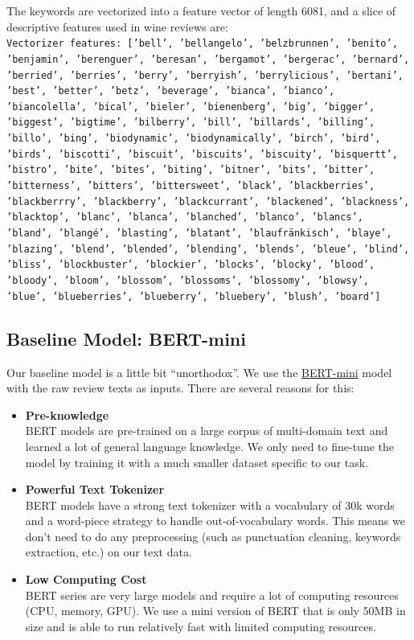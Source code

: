 \documentclass[
]{kaohandt}
\begin{document}
The keywords are vectorized into a feature vector of length 6081, and a slice of descriptive features used in wine reviews are: \\

\texttt{Vectorizer features: ['bell', 'bellangelo', 'belzbrunnen', 'benito', 'benjamin', 'berenguer', 'beresan', 'bergamot', 'bergerac', 'bernard', 'berried', 'berries', 'berry', 'berryish', 'berrylicious', 'bertani', 'best', 'better', 'betz', 'beverage', 'bianca', 'bianco', 'biancolella', 'bical', 'bieler', 'bienenberg', 'big', 'bigger', 'biggest', 'bigtime', 'bilberry', 'bill', 'billards', 'billing', 'billo', 'bing', 'biodynamic', 'biodynamically', 'birch', 'bird', 'birds', 'biscotti', 'biscuit', 'biscuits', 'biscuity', 'bisquertt', 'bistro', 'bite', 'bites', 'biting', 'bitner', 'bits', 'bitter', 'bitterness', 'bitters', 'bittersweet', 'black', 'blackberries', 'blackberrry', 'blackberry', 'blackcurrant', 'blackened', 'blackness', 'blacktop', 'blanc', 'blanca', 'blanched', 'blanco', 'blancs', 'bland', 'blangé', 'blasting', 'blatant', 'blaufränkisch', 'blaye', 'blazing', 'blend', 'blended', 'blending', 'blends', 'bleue', 'blind', 'bliss', 'blockbuster', 'blockier', 'blocks', 'blocky', 'blood', 'bloody', 'bloom', 'blossom', 'blossoms', 'blossomy', 'blowsy', 'blue', 'blueberries', 'blueberry', 'bluebery', 'blush', 'board']}

\subsection*{Baseline Model: BERT-mini}

Our baseline model is a little bit “unorthodox”. We use the \href{https://huggingface.co/google/bert_uncased_L-4_H-256_A-4}{BERT-mini} model with the raw review texts as inputs. There are several reasons for this:

\begin{itemize}
	\item \textbf{Pre-knowledge} \\
	BERT models are pre-trained on a large corpus of multi-domain text and learned a lot of general language knowledge. We only need to fine-tune the model by training it with a much smaller dataset specific to our task.
	\item \textbf{Powerful Text Tokenizer} \\
	BERT models have a strong text tokenizer with a vocabulary of 30k words and a word-piece strategy to handle out-of-vocabulary words. This means we don’t need to do any preprocessing (such as punctuation cleaning, keywords extraction, etc.) on our text data.
	\item \textbf{Low Computing Cost} \\
	BERT series are very large models and require a lot of computing resources (CPU, memory, GPU). We use a mini version of BERT that is only 50MB in size and is able to run relatively fast with limited computing resources.
\end{itemize}
\end{document}
